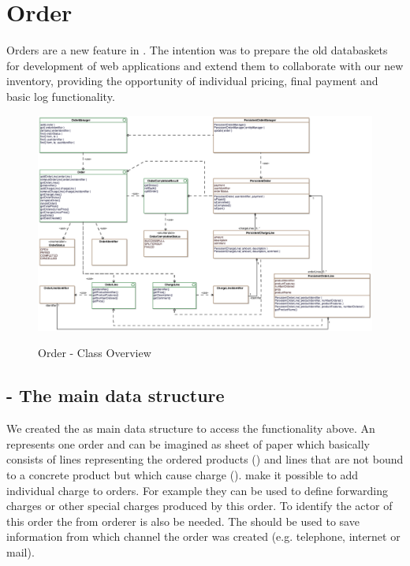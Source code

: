 \newpage
\section{Order}
Orders are a new feature in \salespoint. The intention was to prepare the old databaskets for development of web applications and extend them to collaborate with our new inventory, providing the opportunity of individual pricing, final payment and basic log functionality.

\begin{figure}[ht]
	\centering
  \includegraphics[width=1.0\textwidth]{images/Order_Overview.eps}
	\label{order_overview}
	\caption{Order - Class Overview}
\end{figure}

\subsection{ - The main data structure}
We created the  as main data structure to access the functionality above. An  represents one order and can be imagined as sheet of paper which basically consists of lines representing the ordered products () and lines that are not bound to a concrete product but which cause charge ().  make it possible to add individual charge to orders. For example they can be used to define forwarding charges or other special charges produced by this order.
To identify the actor of this order the  from orderer is also be needed. The  should be used to save information from which channel the order was created (e.g. telephone, internet or mail).

